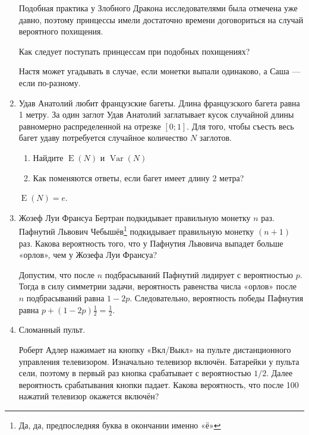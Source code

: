 \documentclass[nobib]{tufte-handout}
\DeclareMathOperator{\Var}{Var}
\DeclareMathOperator{\E}{E}
\begin{document}
\begin{enumerate}
Подобная практика у Злобного Дракона исследователями была отмечена уже давно, поэтому принцессы имели достаточно времени договориться на случай вероятного похищения.

Как следует поступать принцессам при подобных похищениях?

\begin{solution}
Настя может угадывать в случае, если монетки выпали одинаково, а Саша --- если по-разному.
\end{solution}


\item Удав Анатолий любит французские багеты. Длина французского багета равна 1 метру. За один заглот Удав Анатолий заглатывает кусок случайной длины равномерно распределенной на отрезке $[0;1]$. Для того, чтобы съесть весь багет удаву потребуется случайное количество $N$ заглотов. 
\begin{enumerate}
\item Найдите $\E(N)$ и $\Var(N)$
\item Как поменяются ответы, если багет имеет длину 2 метра?
\end{enumerate}

\begin{solution}
$\E(N)=e$.
\end{solution}


\item Жозеф Луи Франсуа Бертран подкидывает правильную монетку $n$ раз. Пафнутий Львович Чебышёв\footnote{Да, да, предпоследняя буква в окончании именно «ё»} подкидывает правильную монетку $(n+1)$ раз. Какова вероятность того, что у Пафнутия Львовича выпадет больше «орлов», чем у Жозефа Луи Франсуа?

\begin{solution}
Допустим, что после $n$ подбрасываний Пафнутий лидирует с вероятностью $p$. Тогда в силу симметрии задачи, вероятность равенства числа «орлов» после $n$ подбрасываний равна $1-2p$. Следовательно, вероятность победы Пафнутия равна $p+(1-2p)\frac{1}{2}=\frac{1}{2}$.
\end{solution}

\item Сломанный пульт. 

Роберт Адлер нажимает на кнопку «Вкл/Выкл» на пульте дистанционного управления телевизором. Изначально телевизор включён. Батарейки у пульта сели, поэтому в первый раз кнопка срабатывает с вероятностью $1/2$. Далее вероятность срабатывания кнопки падает. Какова вероятность, что после 100 нажатий телевизор окажется включён?



\end{enumerate}
\end{document}
